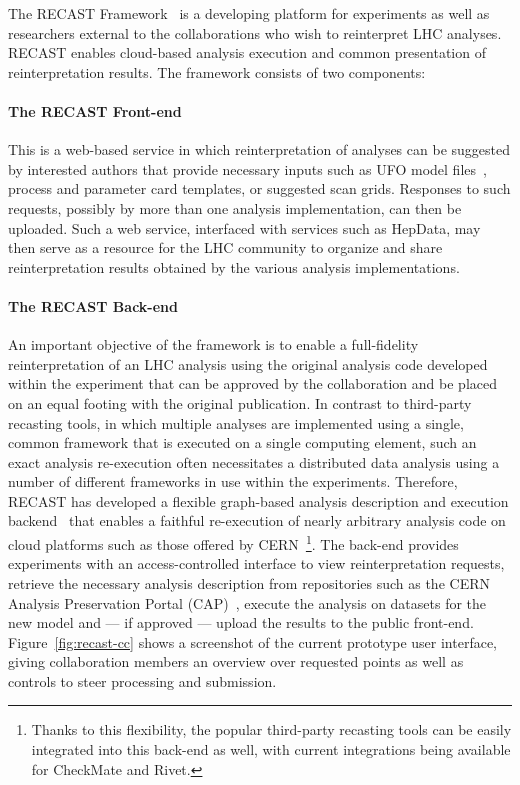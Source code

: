 The RECAST Framework~\cite{Cranmer:2010hk} is a developing platform for experiments as well as researchers external to the collaborations who wish to reinterpret LHC analyses. RECAST enables cloud-based analysis execution and common presentation of reinterpretation results. The framework consists of two components:

\paragraph{The RECAST Front-end} This is a web-based service in which reinterpretation of analyses can be suggested by interested authors that provide necessary inputs such as UFO model files~\cite{Degrande:2011ua}, process and parameter card templates, or suggested scan grids. Responses to such requests, possibly by more than one analysis implementation, can then be uploaded. Such a web service, interfaced with services such as HepData, may then serve as a resource for the LHC community to organize and share reinterpretation results obtained by the various analysis implementations.

\paragraph{The RECAST Back-end} An important objective of the framework is to enable a full-fidelity reinterpretation of an LHC analysis using the original analysis code developed within the experiment that can be approved by the collaboration and be placed on an equal footing with the original publication. In contrast to third-party recasting tools, in which multiple analyses are implemented using a single, common framework that is executed on a single computing element, such an exact analysis re-execution often necessitates a distributed data analysis using a number of different frameworks in use within the experiments. Therefore, RECAST has developed a flexible graph-based analysis description and execution backend~\cite{Heinrich:2297545} that enables a faithful re-execution of nearly arbitrary analysis code on cloud platforms such as those offered by CERN~\footnote{Thanks to this flexibility, the popular third-party recasting tools can be easily integrated into this back-end as well, with current integrations being available for CheckMate and Rivet.}. The back-end provides experiments with an access-controlled interface to view reinterpretation requests, retrieve the necessary analysis description from repositories such as the CERN Analysis Preservation Portal (CAP)~\cite{CAP}, execute the analysis on datasets for the new model and --- if approved --- upload the results to the public front-end. Figure~\ref{fig:recast-cc} shows a screenshot of the current prototype user interface, giving collaboration members an overview over requested points as well as controls to steer processing and submission.

